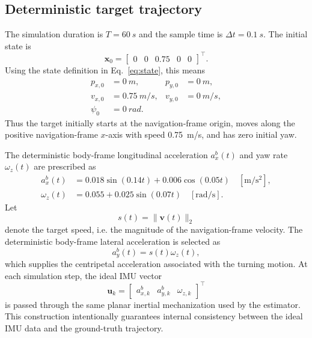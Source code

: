 \subsection{Deterministic target trajectory}
The simulation duration is $T=\SI{60}{s}$ and the sample time is $\Delta t=\SI{0.1}{s}$. The initial state is
\begin{equation}
\bm{x}_0=
\begin{bmatrix}
0 & 0 & 0.75 & 0 & 0
\end{bmatrix}^{\top}.
\end{equation}
Using the state definition in Eq.~\eqref{eq:state}, this means
\begin{align*}
p_{x,0} &= \SI{0}{m}, & p_{y,0} &= \SI{0}{m},\\
v_{x,0} &= \SI{0.75}{m/s}, & v_{y,0} &= \SI{0}{m/s},\\
\psi_0 &= \SI{0}{rad}.
\end{align*}
Thus the target initially starts at the navigation-frame origin, moves along the positive navigation-frame $x$-axis with speed \SI{0.75}{m/s}, and has zero initial yaw.

The deterministic body-frame longitudinal acceleration $a_x^b(t)$ and yaw rate $\omega_z(t)$ are prescribed as
\begin{align}
a_x^b(t) &= 0.018\sin(0.14t)+0.006\cos(0.05t)\quad [\mathrm{m/s^2}],\\
\omega_z(t) &= 0.055+0.025\sin(0.07t)\quad [\mathrm{rad/s}].
\end{align}
Let
\begin{equation}
s(t)=\lVert\bm{v}(t)\rVert_2
\end{equation}
denote the target speed, i.e. the magnitude of the navigation-frame velocity. The deterministic body-frame lateral acceleration is selected as
\begin{equation}
a_y^b(t)=s(t)\omega_z(t),
\end{equation}
which supplies the centripetal acceleration associated with the turning motion. At each simulation step, the ideal IMU vector
\begin{equation}
\bm{u}_k=
\begin{bmatrix}
a_{x,k}^b & a_{y,k}^b & \omega_{z,k}\end{bmatrix}^{\top}
\end{equation}
is passed through the same planar inertial mechanization used by the estimator. This construction intentionally guarantees internal consistency between the ideal IMU data and the ground-truth trajectory.

